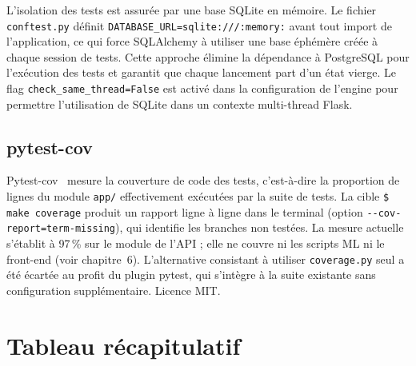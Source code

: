 \documentclass[12pt,a4paper,openany]{report}
\newcommand{\file}[1]{\texttt{#1}}
\newcommand{\cmd}[1]{\texttt{\$ #1}}
\begin{document}
L'isolation des tests est assurée par une base SQLite en mémoire. Le fichier \file{conftest.py} définit \texttt{DATABASE\_URL=sqlite:///:memory:} avant tout import de l'application, ce qui force SQLAlchemy à utiliser une base éphémère créée à chaque session de tests. Cette approche élimine la dépendance à PostgreSQL pour l'exécution des tests et garantit que chaque lancement part d'un état vierge. Le flag \texttt{check\_same\_thread=False} est activé dans la configuration de l'engine pour permettre l'utilisation de SQLite dans un contexte multi-thread Flask.

\subsection{pytest-cov}

Pytest-cov~\cite{pytest-cov} mesure la couverture de code des tests, c'est-à-dire la proportion de lignes du module \file{app/} effectivement exécutées par la suite de tests. La cible \cmd{make coverage} produit un rapport ligne à ligne dans le terminal (option \texttt{-{}-cov-report=term-missing}), qui identifie les branches non testées. La mesure actuelle s'établit à 97\,\% sur le module de l'API ; elle ne couvre ni les scripts ML ni le front-end (voir chapitre~6). L'alternative consistant à utiliser \texttt{coverage.py} seul a été écartée au profit du plugin pytest, qui s'intègre à la suite existante sans configuration supplémentaire. Licence MIT.

\section{Tableau récapitulatif}
\end{document}

